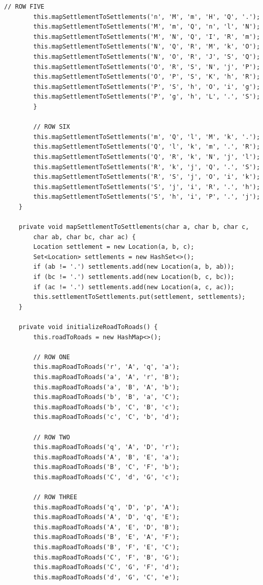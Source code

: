 \documentclass{fank1basedocument}
\begin{document}
\begin{lstlisting}[style=javacode,language=myJava]
		// ROW FIVE
		this.mapSettlementToSettlements('n', 'M', 'm', 'H', 'Q', '.');
		this.mapSettlementToSettlements('M', 'm', 'Q', 'n', 'l', 'N');
		this.mapSettlementToSettlements('M', 'N', 'Q', 'I', 'R', 'm');
		this.mapSettlementToSettlements('N', 'Q', 'R', 'M', 'k', 'O');
		this.mapSettlementToSettlements('N', 'O', 'R', 'J', 'S', 'Q');
		this.mapSettlementToSettlements('O', 'R', 'S', 'N', 'j', 'P');
		this.mapSettlementToSettlements('O', 'P', 'S', 'K', 'h', 'R');
		this.mapSettlementToSettlements('P', 'S', 'h', 'O', 'i', 'g');
		this.mapSettlementToSettlements('P', 'g', 'h', 'L', '.', 'S');
		}

		// ROW SIX
		this.mapSettlementToSettlements('m', 'Q', 'l', 'M', 'k', '.');
		this.mapSettlementToSettlements('Q', 'l', 'k', 'm', '.', 'R');
		this.mapSettlementToSettlements('Q', 'R', 'k', 'N', 'j', 'l');
		this.mapSettlementToSettlements('R', 'k', 'j', 'Q', '.', 'S');
		this.mapSettlementToSettlements('R', 'S', 'j', 'O', 'i', 'k');
		this.mapSettlementToSettlements('S', 'j', 'i', 'R', '.', 'h');
		this.mapSettlementToSettlements('S', 'h', 'i', 'P', '.', 'j');
	}

	private void mapSettlementToSettlements(char a, char b, char c,
		char ab, char bc, char ac) {
		Location settlement = new Location(a, b, c);
		Set<Location> settlements = new HashSet<>();
		if (ab != '.') settlements.add(new Location(a, b, ab));
		if (bc != '.') settlements.add(new Location(b, c, bc));
		if (ac != '.') settlements.add(new Location(a, c, ac));
		this.settlementToSettlements.put(settlement, settlements);
	}

	private void initializeRoadToRoads() {
		this.roadToRoads = new HashMap<>();

		// ROW ONE
		this.mapRoadToRoads('r', 'A', 'q', 'a');
		this.mapRoadToRoads('a', 'A', 'r', 'B');
		this.mapRoadToRoads('a', 'B', 'A', 'b');
		this.mapRoadToRoads('b', 'B', 'a', 'C');
		this.mapRoadToRoads('b', 'C', 'B', 'c');
		this.mapRoadToRoads('c', 'C', 'b', 'd');

		// ROW TWO
		this.mapRoadToRoads('q', 'A', 'D', 'r');
		this.mapRoadToRoads('A', 'B', 'E', 'a');
		this.mapRoadToRoads('B', 'C', 'F', 'b');
		this.mapRoadToRoads('C', 'd', 'G', 'c');

		// ROW THREE
		this.mapRoadToRoads('q', 'D', 'p', 'A');
		this.mapRoadToRoads('A', 'D', 'q', 'E');
		this.mapRoadToRoads('A', 'E', 'D', 'B');
		this.mapRoadToRoads('B', 'E', 'A', 'F');
		this.mapRoadToRoads('B', 'F', 'E', 'C');
		this.mapRoadToRoads('C', 'F', 'B', 'G');
		this.mapRoadToRoads('C', 'G', 'F', 'd');
		this.mapRoadToRoads('d', 'G', 'C', 'e');


\end{lstlisting}
\end{document}

